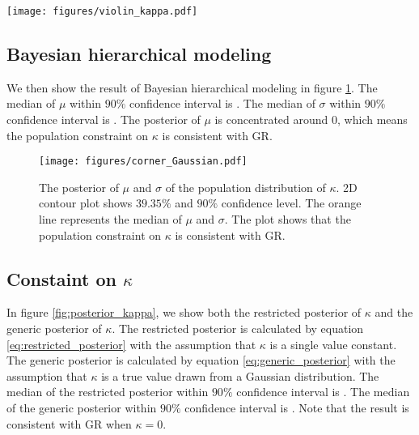 \documentclass[aps,prd,twocolumn,superscriptaddress,preprintnumbers,floatfix,nofootinbib]{revtex4-2}
\begin{document}
\begin{figure*}[ht]
    \texttt{[image: figures/violin\_kappa.pdf]}
    \caption{
        The violin plot shows the posterior of $\kappa$ for 70 events in this study.
        Each violin represents a different event.
        The color of the violins represents the quotient of the median and standard deviation of the posterior.
        The blue horizontal solid line represents the median of the restricted posterior of $\kappa$, and the blue dashed lines enclose the $90\%$ confidence interval of the restricted posterior of $\kappa$.
        The pink horizontal solid line represents $\kappa=0$.
    }
    \label{fig:violin_kappa}
\end{figure*}

\subsection{Bayesian hierarchical modeling}
We then show the result of Bayesian hierarchical modeling in figure \ref{fig:corner_Gaussian}.
The median of $\mu$ within $90\%$ confidence interval is .
The median of $\sigma$ within $90\%$ confidence interval is .
The posterior of $\mu$ is concentrated around $0$, which means the population constraint on $\kappa$ is consistent with GR.

\begin{figure}[h]
    \texttt{[image: figures/corner\_Gaussian.pdf]}
    \caption{
        The posterior of $\mu$ and $\sigma$ of the population distribution of $\kappa$.
        2D contour plot shows $39.35\%$ and $90\%$ confidence level.
        The orange line represents the median of $\mu$ and $\sigma$.
        The plot shows that the population constraint on $\kappa$ is consistent with GR.
    }
    \label{fig:corner_Gaussian}
\end{figure}

\subsection{Constaint on $\kappa$}
In figure \ref{fig:posterior_kappa}, we show both the restricted posterior of $\kappa$ and the generic posterior of $\kappa$.
The restricted posterior is calculated by equation \ref{eq:restricted_posterior} with the assumption that $\kappa$ is a single value constant.
The generic posterior is calculated by equation \ref{eq:generic_posterior} with the assumption that $\kappa$ is a true value drawn from a Gaussian distribution.
The median of the restricted posterior within $90\%$ confidence interval is .
The median of the generic posterior within $90\%$ confidence interval is .
Note that the result is consistent with GR when $\kappa=0$.
\end{document}
